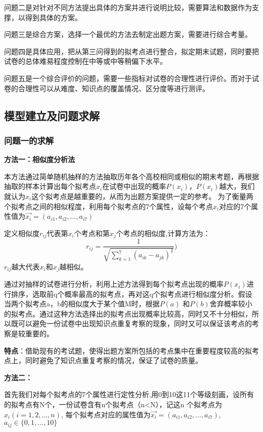 \documentclass{ctexart}
\begin{document}
问题二是对针对不同方法提出具体的方案并进行说明比较，需要算法和数据作为支撑，以得到具体的方案。

问题三是综合方案，选择一个最优的方法去制定出题方案，需要进行综合考量。

问题四是具体应用，把从第三问得到的拟考点进行整合，拟定期末试题，同时要把试卷的总体难易程度控制在中等或中等稍偏下水平。

问题五是一个综合评价的问题，需要一些指标对试卷的合理性进行评价。而对于试卷的合理性可以从难度、知识点的覆盖情况、区分度等进行测评。
\subsection{模型建立及问题求解}
\subsubsection{问题一的求解}

\textbf{方法一：相似度分析法}

本方法通过简单随机抽样的方法抽取历年各个高校相同或相似的期末考题，再根据抽取的样本计算出每个拟考点$x_{i}$在试卷中出现的概率$P(x_{i})$，$P(x_{i})$越大，我们就认为$x_{i}$这个拟考点是越重要的，从而为出题方案提供一定的参考。
为了衡量两个拟考点之间的相似程度，利用每个拟考点的7个属性，设每个考点$x_{i}$对应的7个属性值为$\overrightarrow{x_{i}}=(a_{i1},a_{i2},...,a_{i7})$

定义相似度$r_{ij}$代表第$x_{i}$个考点和第$x_{j}$个考点的相似度,计算方法为：
$$r_{ij}=\frac{1}{\sqrt{\sum\limits_{k=1}^{7}(a_{ik}-a_{jk})^2}})$$
$r_{ij}$越大代表$x_{i}$和$x_{j}$越相似。

通过对抽样的试卷进行分析，利用上述方法得到每个拟考点出现的概率$P(x_{i})$进行排序，选取前q个概率最高的拟考点，再对这q个拟考点进行相似度分析。假设当两个拟考点a，b的相似度大于某个值M时，根据$P(a)$ 和$P(b)$舍弃概率较小的拟考点。通过这种方法选择出的拟考点出现概率比较高，同时又不十分相似，所以既可以避免一份试卷中出现知识点重复考察的现象，同时又可以保证该考点的考察是较重要的。

\textbf{特点}：借助现有的考试题，使得出题方案所包括的考点集中在重要程度较高的拟考点上，同时避免了知识点重复考察的情况，保证了试卷的质量。


\textbf{方法二：}

首先我们对每个拟考点的7个属性进行定性分析,用0到10这11个等级刻画，设所有的拟考点有N个，一份试卷含有n个拟考点（n<N），记这n 个拟考点为$x_{i}(i=1,2,…,n)$, 每个拟考点对应的属性值为$\overrightarrow{x_{i}}=(a_{i1},a_{i2},...,a_{i7})$, $a_{ij}\in\{0,1,...,10\}$
\end{document}
